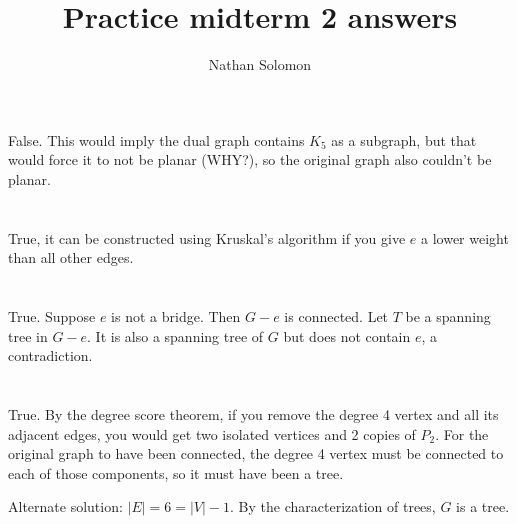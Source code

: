 \documentclass[12pt]{article}
\begin{document}
\title{Practice midterm 2 answers}
\author{Nathan Solomon}
\maketitle

\section{}
\noindent{}\bigskip\par

False. This would imply the dual graph contains $K_5$ as a subgraph, but that would force it to not be planar (WHY?), so the original graph also couldn't be planar.
\section{}
\noindent{}\bigskip\par

True, it can be constructed using Kruskal's algorithm if you give $e$ a lower weight than all other edges.
\section{}
\noindent{}\bigskip\par
True. Suppose $e$ is not a bridge. Then $G-e$ is connected. Let $T$ be a
spanning tree in $G-e$. It is also a spanning tree of $G$ but does not contain $e$, a contradiction.
\section{}
\noindent{}\bigskip\par
True. By the degree score theorem, if you remove the degree 4 vertex and all its adjacent edges, you would get two isolated vertices and 2 copies of $P_2$. For the original graph to have been connected, the degree 4 vertex must be connected to each of those components, so it must have been a tree.
\par
Alternate solution: $|E| = 6 = |V | - 1$. By the characterization of trees, $G$ is a tree.
\end{document}
